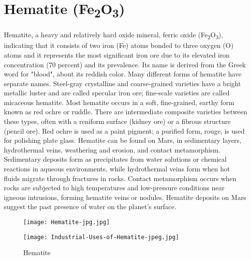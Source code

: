 \documentclass[12pt,a4paper, top=1.9cm, bottom=2.03cm, left=3.81cm, right=1.9cm]{article}
\begin{document}
\section{Hematite (Fe\textsubscript{2}O\textsubscript{3})}
\onehalfspacing
\noindent\fontsize{12}{14}\selectfont Hematite, a heavy and relatively hard oxide mineral, ferric oxide (Fe\textsubscript{2}O\textsubscript{3}), indicating that it consists of two iron (Fe) atoms bonded to three oxygen (O) atoms and it represents the most significant iron ore due to its elevated iron concentration (70 percent) and its prevalence.
Its name is derived from the Greek word for "blood", about its reddish color. Many different forms of hematite have separate names. Steel-gray crystalline and coarse-grained varieties have a bright metallic luster and are called specular iron ore; fine-scale varieties are called micaceous hematite.
Most hematite occurs in a soft, fine-grained, earthy form known as red ochre or ruddle. There are intermediate composite varieties between these types, often with a reniform surface (kidney ore) or a fibrous structure (pencil ore). Red ochre is used as a paint pigment; a purified form, rouge, is used for polishing plate glass.
Hematite can be found on Mars, in sedimentary layers, hydrothermal veins, weathering and erosion, and contact metamorphism. Sedimentary deposits form as precipitates from water solutions or chemical reactions in aqueous environments, while hydrothermal veins form when hot fluids migrate through fractures in rocks. Contact metamorphism occurs when rocks are subjected to high temperatures and low-pressure conditions near igneous intrusions, forming hematite veins or nodules. Hematite deposits on Mars suggest the past presence of water on the planet's surface.
\onehalfspacing
\begin{figure}[h!]
    \centering
    \begin{minipage}{0.45\textwidth}
        \centering
        \texttt{[image: Hematite-jpg.jpg]}
    \end{minipage} \hfill
    \begin{minipage}{0.4\textwidth}
        \centering
        \texttt{[image: Industrial-Uses-of-Hematite-jpeg.jpg]}
    \end{minipage}
    \caption{Hematite}
\end{figure}
\end{document}
